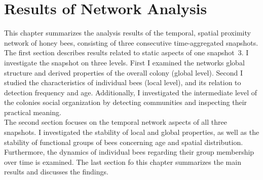 \chapter{Results of Network Analysis}
\label{ch:results}
This chapter summarizes the analysis results of the temporal, spatial proximity network of honey bees, consisting of three consecutive time-aggregated snapshots.\\
The first section describes results related to static aspects of one snapshot~3.
I investigate the snapshot on three levels. First I examined the networks global structure and derived properties of the overall colony (global level). Second I studied the characteristics of individual bees (local level), and its relation to detection frequency and age.
Additionally, I investigated the intermediate level of the colonies social organization by detecting communities and inspecting their practical meaning.\\
The second section focuses on the temporal network aspects of all three snapshots.
I investigated the stability of local and global properties, as well as the stability of functional groups of bees concerning age and spatial distribution. Furthermore, the dynamics of individual bees regarding their group membership over time is examined.
The last section fo this chapter summarizes the main results and discusses the findings.


\newpage


